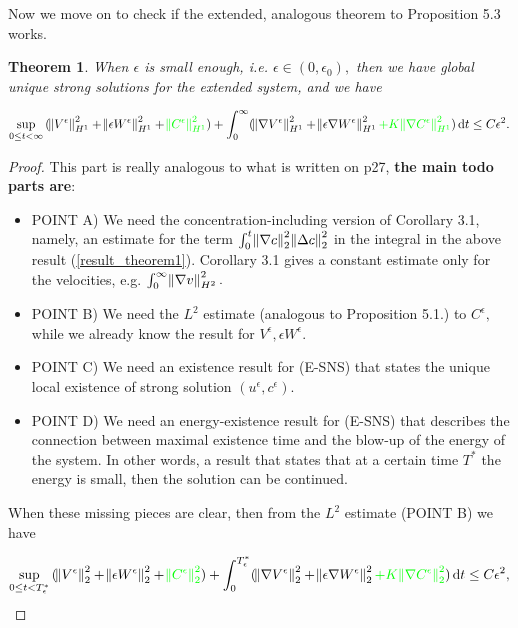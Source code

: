 \documentclass[11pt]{article}
\newtheorem{theorem}{Theorem}
\newcommand*\diff{\mathop{}\!\mathrm{d}}
\begin{document}
Now we move on to check if the extended, analogous theorem to Proposition 5.3 works.

\begin{theorem}
When $\epsilon$ is small enough, i.e. $\epsilon \in (0, \epsilon_0),$ then we have global unique strong solutions for the extended system, and we have

$$ \sup_{0 \leq t < \infty}{(\norm{V^\epsilon}^2_{H^1} + \norm{\epsilon W^\epsilon}^2_{H^1} + \textcolor{green}{\norm{C^\epsilon}^2_{H^1}}) } + \int_0^\infty (\norm{\nabla V^\epsilon}^2_{H^1} + \norm{\epsilon \nabla W^\epsilon}^2_{H^1} \textcolor{green}{+ K \norm{\nabla C^\epsilon}^2_{H^1}}) \diff t \leq C \epsilon^2. $$

\end{theorem}

\begin{proof}

This part is really analogous to what is written on p27, \textbf{the main todo parts are}:

\begin{itemize}

  \item POINT A) We need the concentration-including version of Corollary 3.1, namely, an estimate for the term $\int_0^t \norm{\nabla c}^2_2 \norm{\Delta c}^2_2$ in the integral in the above result (\ref{result_theorem1}). Corollary 3.1 gives a constant estimate only for the velocities, e.g. $\int_0^\infty \norm{\nabla v}^2_{H^2}.$
  \item POINT B) We need the $L^2$ estimate (analogous to Proposition 5.1.) to $C^\epsilon,$ while we already know the result for $V^\epsilon, \epsilon W^\epsilon.$
  \item POINT C) We need an existence result for (E-SNS) that states the unique local existence of strong solution $(u^\epsilon, c^\epsilon)$.
  \item POINT D) We need an energy-existence result for (E-SNS) that describes the connection between maximal existence time and the blow-up of the energy of the system. In other words, a result that states that at a certain time $T^*$ the energy is small, then the solution can be continued.

\end{itemize}

When these missing pieces are clear, then from the $L^2$ estimate (POINT B) we have

$$ \sup_{0 \leq t < T^*_\epsilon}{(\norm{V^\epsilon}^2_2 + \norm{\epsilon W^\epsilon}^2_2 + \textcolor{green}{\norm{C^\epsilon}^2_2}) } + \int_0^{T^*_\epsilon} (\norm{\nabla V^\epsilon}^2_2 + \norm{\epsilon \nabla W^\epsilon}^2_2 \textcolor{green}{+ K \norm{\nabla C^\epsilon}^2_2}) \diff t \leq C \epsilon^2, $$


\end{proof}
\end{document}
